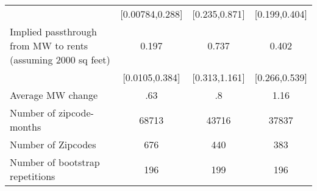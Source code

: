{\begin{tabular}{l*{3}{c}}
            &       [0.00784,0.288]         &         [0.235,0.871]         &         [0.199,0.404]         \\
[1em]
Implied passthrough from MW to rents (assuming 2000 sq feet)&                 0.197\sym{*}  &                 0.737\sym{***}&                 0.402\sym{***}\\
            &        [0.0105,0.384]         &         [0.313,1.161]         &         [0.266,0.539]         \\
\hline
Average MW change&                   .63         &                    .8         &                  1.16         \\
Number of zipcode-months&                 68713         &                 43716         &                 37837         \\
Number of Zipcodes&                   676         &                   440         &                   383         \\
Number of bootstrap repetitions&                   196         &                   199         &                   196         \\
\hline\hline
\end{tabular}
}
